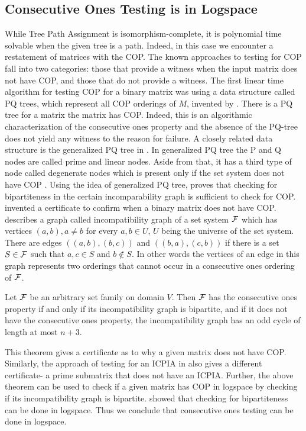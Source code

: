 \subsection{Consecutive Ones Testing is in Logspace}
\label{sec:cotlogspace}
While Tree Path Assignment is isomorphism-complete, it is polynomial
time solvable when the given tree is a path.  Indeed, in this case we
encounter a restatement of matrices with the COP.  The known
approaches to testing for COP fall into two categories: those that
provide a witness when the input matrix does not have COP, and those
that do not provide a witness.  The first linear time algorithm for
testing COP for a binary matrix was using a data structure called PQ
trees, which represent all COP orderings of $M$, invented by
\cite{bl76}. There is a PQ tree for a matrix \iff the matrix has COP.
Indeed, this is an algorithmic characterization of the consecutive
ones property and the absence of the PQ-tree does not yield any
witness to the reason for failure.  A closely related data structure
is the generalized PQ tree in \cite{mcc04}.  In generalized PQ tree
the P and Q nodes are called prime and linear nodes. Aside from that,
it has a third type of node called degenerate nodes which is present
only if the set system does not have COP \cite{mcc04}.  Using the idea
of generalized PQ tree, \cite{mcc04} proves that checking for
bipartiteness in the certain incomparability graph is sufficient to
check for COP.  \cite{mcc04} invented a certificate to confirm when a
binary matrix does not have COP.  \cite{mcc04} describes a graph
called incompatibility graph of a set system ${\cal F}$ which has vertices
$(a,b), a \ne b$ for every $a, b \in U$, $U$ being the universe of the
set system. There are edges $((a,b),(b,c))$ and $((b,a),(c,b))$ if
there is a set $S \in {\cal F}$ such that $a, c \in S$ and $b \notin S$. In
other words the vertices of an edge in this graph represents two
orderings that cannot occur in a consecutive ones ordering of ${\cal F}$.
\begin{theorem}
  Let ${\cal F}$ be an arbitrary set family on domain $V$. Then ${\cal F}$ has
  the consecutive ones property if and only if its incompatibility
  graph is bipartite, and if it does not have the consecutive ones
  property, the incompatibility graph has an odd cycle of length at
  most $n+3$.
\end{theorem}
This theorem gives a certificate as to why a given matrix does not
have COP.  Similarly, the approach of testing for an ICPIA in
\cite{nsnrs09} also gives a different certificate- a prime submatrix
that does not have an ICPIA.  Further, the above theorem can be used
to check if a given matrix has COP in logspace by checking if its
incompatibility graph is bipartite. \cite{rei84} showed that checking
for bipartiteness can be done in logspace. Thus we conclude that
consecutive ones testing can be done in logspace.

